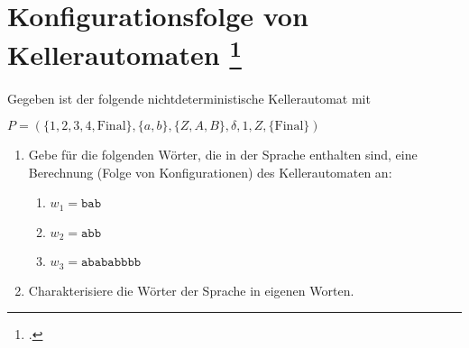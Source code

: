 \documentclass{lehramt-informatik-aufgabe}
\begin{document}
\section{Konfigurationsfolge von Kellerautomaten
\footcite{theo:ab:2}}

Gegeben ist der folgende nichtdeterministische Kellerautomat mit

$P = (\{1, 2, 3, 4, \text{Final}\}, \{a, b\}, \{Z, A, B\}, \delta, 1, Z, \{\text{Final}\})$

\begin{enumerate}

\item Gebe für die folgenden Wörter, die in der Sprache enthalten sind,
eine Berechnung (Folge von Konfigurationen) des Kellerautomaten an:

\begin{enumerate}


\item $w_1 = \texttt{bab}$


\item $w_2 = \texttt{abb}$


\item $w_3 = \texttt{abababbbb}$
\end{enumerate}

\item Charakterisiere die Wörter der Sprache in eigenen Worten.

\end{enumerate}
\end{document}
